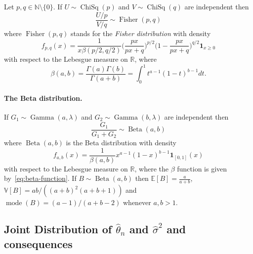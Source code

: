 \documentclass[
	fontsize=11pt, %
	twoside=false, %
	numbers=noenddot, %
]{kaobook}
\DeclareMathOperator{\mode}{mode}
\DeclareMathOperator{\bet}{Beta}
\DeclareMathOperator{\chisq}{ChiSq}
\DeclareMathOperator{\fis}{Fisher}
\DeclareMathOperator{\gam}{Gamma}
\newcommand{\E}{\mathbb E}
\newcommand{\R}{\mathbb R}
\newcommand{\N}{\mathbb N}
\newcommand{\var}{\mathbb V}
\newcommand{\wh}{\widehat}
\newcommand{\ind}[1]{\mathbf 1_{#1}}
\begin{document}
Let $p, q \in \N \setminus \{ 0 \} $. If $U \sim \chisq(p)$ and $V \sim \chisq(q)$ are independent then
\begin{equation}
	\label{eq:fisher-definition}
	\frac{U / p}{V / q} \sim \fis(p, q)
\end{equation}
where $\fis(p, q)$ stands for the \emph{Fisher distribution} with density
\begin{equation*}
	f_{p, q}(x) = \frac{1}{x \beta(p/2, q/2)} \Big( \frac{px}{px + q} \Big)^{p/2} \Big(1 - \frac{px}{px + q} \Big)^{q/2} \ind{x \geq 0}
\end{equation*}
with respect to the Lebesgue measure on $\R$, where
\begin{equation}
	\label{eq:beta-function}
	\beta(a, b) = \frac{\Gamma(a) \Gamma(b)}{\Gamma(a + b)}  = \int_0^1 t^{a-1} (1 - t)^{b - 1} dt.
\end{equation}

\paragraph{The Beta distribution.} %

If $G_1 \sim \gam(a, \lambda)$ and $G_2 \sim \gam(b, \lambda)$ are independent then
\begin{equation*}
	\frac{G_1}{G_1 + G_2} \sim \bet(a, b)
\end{equation*}
where $\bet(a, b)$ is the Beta distribution with density
\begin{equation*}
	f_{a, b}(x) = \frac{1}{\beta(a, b)} x^{a - 1} (1 - x)^{b - 1} \ind{[0, 1]}(x)
\end{equation*}
with respect to the Lebesgue measure on $\R$, where the $\beta$ function is given by~\eqref{eq:beta-function}.
If $B \sim \bet(a, b)$ then $\E[B] = \frac{a}{a + b}$, $\var[B] = ab / ((a + b)^2 (a + b + 1))$ and $\mode(B) = (a - 1) / (a + b - 2)$ whenever $a, b > 1$.


\subsection{Joint Distribution of $\wh \theta_n$ and $\wh \sigma^2$ and consequences}
\end{document}
